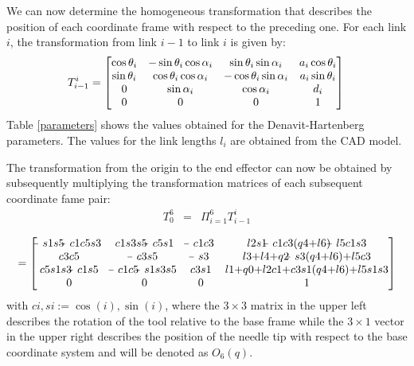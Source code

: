 We can now determine the homogeneous transformation that describes the position of each coordinate frame with respect to the preceding one. For each link $i$, the transformation from link $i-1$ to link $i$ is given by:
\begin{equation}\label{T_i}
T_{i-1}^i=\begin{bmatrix}
		\cos\theta_i & -\sin\theta_i\cos\alpha_i & \sin\theta_i\sin\alpha_i & a_i\cos\theta_i \\
		\sin\theta_i & \cos\theta_i\cos\alpha_i & -\cos\theta_i\sin\alpha_i & a_i\sin\theta_i\\
		0 & \sin\alpha_i & \cos\alpha_i & d_i\\
		0 & 0 & 0 & 1
		\end{bmatrix}\\
		\\
\end{equation}
Table \ref{parameters} shows the values obtained for the Denavit-Hartenberg parameters. The values for the link lengths $l_i$ are obtained from the CAD model. 

The transformation from the origin to the end effector can now be obtained by subsequently multiplying the transformation matrices of each subsequent coordinate fame pair:
\begin{eqnarray}\label{Pi_6}
	T_0^6 &=& \Pi_{i=1}^6 T_{i-1}^i
\end{eqnarray}


\begin{equation}\label{T_6}
=	\begin{bmatrix}
			\matminus s1s5\matminus c1c5s3 & c1s3s5\matminus c5s1 & \matminus c1c3 & l2s1\matminus c1c3(q4\matplus  l6)\matminus l5c1s3 \\
			c3c5 & \matminus c3s5 & \matminus s3 & l3\matplus  l4\matplus  q2\matminus s3(q4\matplus  l6)\matplus  l5c3\\
			c5s1s3\matminus c1s5 & \matminus c1c5\matminus s1s3s5 & c3s1 & l1\matplus  q0\matplus  l2c1\matplus  c3s1(q4\matplus  l6)\matplus  l5s1s3\\
			0 & 0 & 0 & 1
	\end{bmatrix}
\end{equation}
with $ci,si := \cos(i), \sin(i)$, where the $3\times 3$ matrix in the upper left describes the rotation of the tool relative to the base frame while the $3\times 1$ vector in the upper right describes the position of the needle tip with respect to the base coordinate system and will be denoted as $O_6(q)$.

